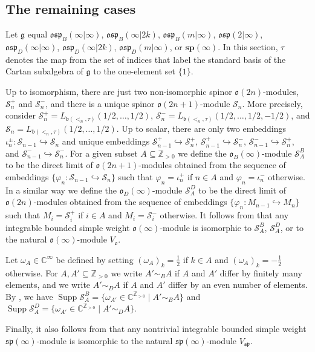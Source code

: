 \documentclass[12pt]{amsart}
\newcommand\C{\mathbb{C}}
\newcommand\Z{\mathbb{Z}}
\newcommand\g{\mathfrak{g}}
\newcommand\fb{\mathfrak{b}}
\newcommand\fsp{\mathfrak{sp}}
\newcommand\fosp{\mathfrak{osp}}
\newcommand\fo{\mathfrak{o}}
\newcommand\cS{\mathcal{S}}
\newcommand\bsp{\mathbf{sp}}
\DeclareMathOperator{\Supp}{Supp} %
\theoremstyle{plain}
\theoremstyle{definition}
\numberwithin{equation}{section}
\begin{document}
\subsection{The remaining cases}\label{sec:remaining.cases}
Let $\g$ equal $\fosp_B(\infty|\infty)$, $\fosp_B(\infty|2k)$, $\fosp_B(m|\infty)$, $\fosp(2|\infty)$, $\fosp_D(\infty|\infty)$, $\fosp_D(\infty|2k)$, $\fosp_D(m|\infty)$, or $\bsp(\infty)$. In this section, $\tau$ denotes the map from the set of indices that label the standard basis of the Cartan subalgebra of $\g$ to the one-element set $\{1\}$.


Up to isomorphism, there are just two non-isomorphic spinor $\fo(2n)$-modules, $\cS_n^+$ and $\cS_n^-$, and there is a unique spinor $\fo(2n+1)$-module $\cS_n$. More precisely, consider $\cS_n^+ = L_{\fb(<_n, \tau)}(1/2,\ldots, 1/2)$, $\cS_n^- = L_{\fb(<_n, \tau)}(1/2,\ldots, 1/2,-1/2)$, and $\cS_n = L_{\fb(<_n, \tau)}(1/2,\ldots, 1/2)$.  Up to scalar, there are only two embeddings $\iota_{n}^\pm : \cS_{n-1}\hookrightarrow \cS_n$ and unique embeddings $\cS_{n-1}^+\hookrightarrow \cS_n^+$, $\cS_{n-1}^+\hookrightarrow \cS_n^-$, $\cS_{n-1}^-\hookrightarrow \cS_n^+$, and $\cS_{n-1}^-\hookrightarrow \cS_n^-$. For a given subset $A\subseteq \Z_{>0}$ we define the $\fo_B(\infty)$-module $\cS_A^B$ to be the direct limit of $\fo(2n+1)$-modules obtained from the sequence of embeddings $\{\varphi_n: \cS_{n-1}\hookrightarrow \cS_n\}$ such that $\varphi_n=\iota_n^+$ if $n\in A$ and $\varphi_n=\iota_n^-$ otherwise. In a similar way we define the $\fo_D(\infty)$-module $\cS_A^D$ to be the direct limit of $\fo(2n)$-modules obtained from the sequence of embeddings $\{\varphi_n:M_{n-1}\hookrightarrow M_n\}$ such that $M_i=\cS_i^+$ if $i\in A$ and $M_i=\cS_i^-$ otherwise. It follows from \cite[Proposition~5.3 and Theorem~5.5]{GP20} that any integrable bounded simple weight $\fo(\infty)$-module is isomorphic to $\cS_A^B$, $\cS_A^D$, or to the natural $\fo(\infty)$-module $V_\fo$.

Let $\omega_A\in \C^\infty$ be defined by setting $(\omega_A)_k =\frac{1}{2}$ if $k\in A$ and $(\omega_A)_k =-\frac{1}{2}$ otherwise. For  $A, A'\subseteq \Z_{>0}$ we write $A'\sim_B A$ if $A$ and $A'$ differ by finitely many elements, and we write $A'\sim_D A$ if $A$ and $A'$ differ by an even number of elements. By \cite[\S~5.2]{GP20}, we have $\Supp \cS_A^B=\{\omega_{A'} \in \C^{\Z_{>0}} \mid  A'\sim_B A\}$ and $\Supp \cS_A^D=\{\omega_{A'} \in \C^{\Z_{>0}} \mid A'\sim_D A\}$.

Finally, it also follows from \cite[Proposition~5.7]{GP20} that any nontrivial integrable bounded simple weight $\fsp(\infty)$-module is isomorphic to the natural $\fsp(\infty)$-module $V_\fsp$.  
\end{document}
